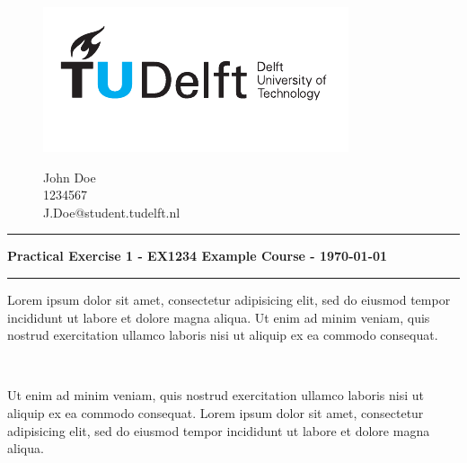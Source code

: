 \documentclass[a4paper, answers, addpoints]{exam}
\begin{document}
\begin{figure}[ht!]
    \begin{minipage}[H]{0.33\textwidth}
		\vspace{0.3cm}
		\includegraphics[scale=0.8]{TUDelftLogo.pdf}
	\end{minipage}
	\begin{minipage}[H]{0.33\textwidth}
    \hfill
	\end{minipage}
	\begin{minipage}[H]{0.33\textwidth}
		\begin{center}
		\large{John Doe}\\
		\normalsize
			1234567\\
			J.Doe@student.tudelft.nl
		\end{center}
	\end{minipage}
\end{figure}
\vspace{-0.5cm}
\hrule
\begin{center}
	\textbf{Practical Exercise 1 - EX1234 Example Course  - \today}\\
\end{center}
\hrule
\vspace{0.3cm}
    \begin{questions}
        \question[2] Lorem ipsum dolor sit amet, consectetur adipisicing elit, sed do eiusmod tempor incididunt ut labore et dolore magna aliqua. Ut enim ad minim veniam, quis nostrud exercitation ullamco laboris nisi ut aliquip ex ea commodo consequat.
        \begin{solution}\\
            \blindmathpaper
        \end{solution}
        \question[2] Ut enim ad minim veniam, quis nostrud exercitation ullamco laboris nisi ut aliquip ex ea commodo consequat. Lorem ipsum dolor sit amet, consectetur adipisicing elit, sed do eiusmod tempor incididunt ut labore et dolore magna aliqua.
        \begin{solution}\\
            \blindmathpaper
        \end{solution}
    \end{questions}
    
\end{document}
